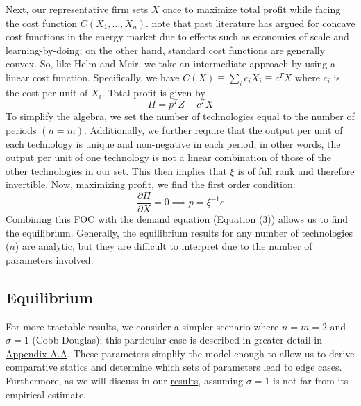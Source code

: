 \documentclass[11pt,a4paper]{extarticle}
\begin{document}
Next, our representative firm sets $X$ once to maximize total profit while facing the cost function $C(X_1, \dots, X_n)$.  \citet{HH} note that past literature has argued for concave cost functions in the energy market due to effects such as economies of scale and learning-by-doing; on the other hand, standard cost functions are generally convex. So, like Helm and Meir, we take an intermediate approach by using a linear cost function. Specifically, we have $C(X) \equiv \sum_i c_i X_i \equiv c^T X$ where $c_i$ is the cost per unit of $X_i$. Total profit is given by 
\begin{equation}
\Pi = p^T Z - c^T X
\end{equation}
To simplify the algebra, we set the number of technologies equal to the number of periods $(n=m)$. Additionally, we further require that the output per unit of each technology is unique and non-negative in each period; in other words, the output per unit of one technology is not a linear combination of those of the other technologies in our set. This then implies that $\xi$ is of full rank and therefore invertible.  Now, maximizing profit, we find the first order condition:
\begin{equation}
\frac{\partial \Pi}{\partial X} = 0 \implies p = \xi^{-1} c
\end{equation}
Combining this FOC with the demand equation (Equation (3)) allows us to find the equilibrium. Generally, the equilibrium results for any number of technologies ($n$) are analytic, but they are difficult to interpret due to the number of parameters involved. 

\subsection{Equilibrium}

For more tractable results, we consider a simpler scenario where $n = m = 2$ and $\sigma = 1$ (Cobb-Douglas); this particular case is described in greater  detail  in \hyperref[sec:cobbdoug]{Appendix A.A}. These parameters simplify the model enough to allow us to derive comparative statics and determine which sets of parameters lead to edge cases. Furthermore, as we will discuss in our \hyperref[sec:results]{results}, assuming $\sigma=1$ is not far from its empirical estimate. 
\end{document}
